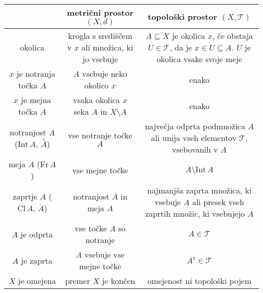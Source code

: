 \documentclass[10pt, a4paper]{article}
\newcommand{\stcomp}[1]{{#1}^{\mathsf{c}}}
\newcommand{\cl}{\mathrm{Cl}}
\newcommand{\inte}{\mathrm{Int}}
\newcommand{\fr}{\mathrm{Fr}}
\begin{document}
\begin{table}[bth!]
  \centering
  \begin{tabular}{ccc}
    \toprule
                                  & metrični prostor $(X, d)$                                              & topološki prostor $(X, \mathcal{T})$\\
    \midrule
    okolica                       & \makecell{krogla s središčem v $x$\\ ali množica, ki jo vsebuje}       & \makecell{$A \subseteq X$ je okolica $x$, če obstaja\\ $U \in \mathcal{T}$, da je $x \in U \subseteq A$.\\$U$ je okolica vsake svoje meje} \\         
    \midrule
    $x$ je notranja točka $A$    & $A$ vsebuje neko okolico $x$                                           & enako\\
    \midrule
    $x$ je mejna točka $A$        & vsaka okolica $x$ seka $A$ in $X \setminus A$                          & enako\\
    \midrule
    notranjost $A$ ($\inte\, A$, $\overset{\circ}{A}$)    & vse notranje točke $A$                                                 & \makecell{največja odprta podmnožica\\ $A$ ali unija vseh elementov $\mathcal{T}$,\\vsebovanih v $A$}\\
    \midrule
    meja $A$ ($\fr \, A$)                     & vse mejne točke                                                        & $\overline{A} \setminus \inte\, A$\\
    \midrule
    zaprtje $A$ ($\cl\, A$, $\overline{A}$)  & notranjost $A$ in meja $A$                                             & \makecell{najmanjša zaprta množica,\\ ki vsebuje $A$ ali presek vseh\\zaprtih množic, ki vsebujejo $A$}\\
    \midrule 
    $A$ je odprta                 & vse točke $A$ so notranje                                              & $A \in \mathcal{T}$\\
    \midrule
    $A$ je zaprta                 & $A$ vsebuje vse mejne točke                                            & $\stcomp{A} \in \mathcal{T}$\\
    \midrule
    $X$ je omejena                & premer $X$ je končen                                                   & omejenost ni topološki pojem\\

\end{tabular}
\end{table}
\end{document}
